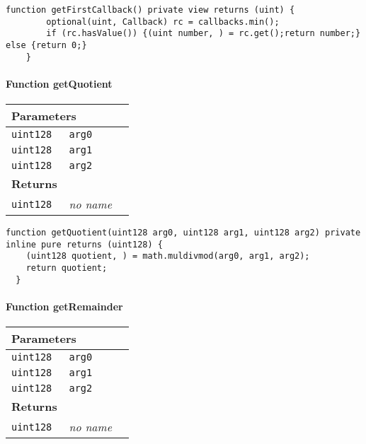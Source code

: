 \vspace{2cm}

\begin{lstlisting}[firstnumber=121]
  function getFirstCallback() private view returns (uint) {
		optional(uint, Callback) rc = callbacks.min();
		if (rc.hasValue()) {(uint number, ) = rc.get();return number;} else {return 0;}
	}
\end{lstlisting}

\paragraph{Function getQuotient}


\ifsoltables
\noindent\begin{tabular}{|l|l|p{5cm}|}\hline
\multicolumn{3}{|l|}{\bf Parameters}\\\hline
\tt uint128 & \tt arg0 &\\\hline
\tt uint128 & \tt arg1 &\\\hline
\tt uint128 & \tt arg2 &\\\hline
\multicolumn{3}{|l|}{\bf Returns}\\\hline
\tt uint128 & {\em no name} &\\\hline
\end{tabular}
\fi

\vspace{2cm}

\begin{lstlisting}[firstnumber=109]
  function getQuotient(uint128 arg0, uint128 arg1, uint128 arg2) private inline pure returns (uint128) {
    (uint128 quotient, ) = math.muldivmod(arg0, arg1, arg2);
    return quotient;
  }
\end{lstlisting}

\paragraph{Function getRemainder}


\ifsoltables
\noindent\begin{tabular}{|l|l|p{5cm}|}\hline
\multicolumn{3}{|l|}{\bf Parameters}\\\hline
\tt uint128 & \tt arg0 &\\\hline
\tt uint128 & \tt arg1 &\\\hline
\tt uint128 & \tt arg2 &\\\hline
\multicolumn{3}{|l|}{\bf Returns}\\\hline
\tt uint128 & {\em no name} &\\\hline
\end{tabular}
\fi

